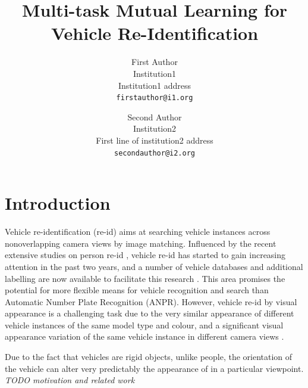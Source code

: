 \documentclass[10pt,twocolumn,letterpaper]{article}
\begin{document}
\title{Multi-task Mutual Learning for Vehicle Re-Identification}

\author{First Author\\
Institution1\\
Institution1 address\\
{\tt\small firstauthor@i1.org}
\and
Second Author\\
Institution2\\
First line of institution2 address\\
{\tt\small secondauthor@i2.org}
}

\maketitle

\begin{abstract}

\end{abstract}

\section{Introduction}

Vehicle re-identification (re-id) aims at searching vehicle instances across nonoverlapping camera views by image matching. Influenced by the recent extensive studies on person re-id \cite{gong2014re}, vehicle re-id has started to gain increasing attention in the past two years, and a number of vehicle databases and additional labelling are now available to facilitate this research \cite{liu2016vehicleid,liu2016veri,yang2015large,kanaci2018vehicle,wang2017orientation}. This area promises the potential for more flexible means for vehicle recognition and search than Automatic Number Plate Recognition (ANPR). However, vehicle re-id by visual appearance is a
challenging task due to the very similar appearance of different vehicle instances
of the same model type and colour, and a significant visual appearance variation
of the same vehicle instance in different camera views \cite{}.


Due to the fact that vehicles are rigid objects, unlike people, the orientation of the vehicle can alter very predictably the appearance of in a particular viewpoint. \emph{TODO motivation and related work}
\end{document}
